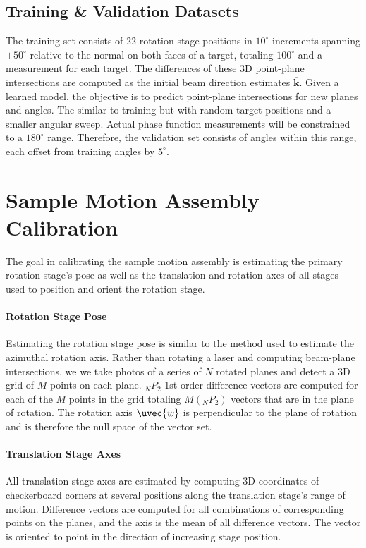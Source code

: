 \subsection{Training \& Validation Datasets}
The training set consists of 22 rotation stage positions in $10^\circ$ increments spanning $\pm 50^\circ$ relative to the normal on both faces of a target, totaling $100^\circ$ and a measurement for each target. The differences of these 3D point-plane intersections are computed as the initial beam direction estimates $\mathbf{\overline{k}}$. Given a learned model, the objective is to predict point-plane intersections for new planes and angles. The similar to training but with random target positions and a smaller angular sweep. Actual phase function measurements will be constrained to a $180^\circ$ range. Therefore, the validation set consists of angles within this range, each offset from training angles by $5^\circ$.

\section{Sample Motion Assembly Calibration}
The goal in calibrating the sample motion assembly is estimating the primary rotation stage's pose as well as the translation and rotation axes of all stages used to position and orient the rotation stage.

\paragraph{Rotation Stage Pose} Estimating the rotation stage pose is similar to the method used to estimate the azimuthal rotation axis. Rather than rotating a laser and computing beam-plane intersections, we we take photos of a series of $N$ rotated planes and detect a 3D grid of $M$ points on each plane. $_N P_2$ 1st-order difference vectors are computed for each of the $M$ points in the grid totaling $M(_N P_2)$ vectors that are in the plane of rotation. The rotation axis $\uvec{w}$ is perpendicular to the plane of rotation and is therefore the null space of the vector set.

\paragraph{Translation Stage Axes} All translation stage axes are estimated by computing 3D coordinates of checkerboard corners at several positions along the translation stage's range of motion. Difference vectors are computed for all combinations of corresponding points on the planes, and the axis is the mean of all difference vectors. The vector is oriented to point in the direction of increasing stage position.

